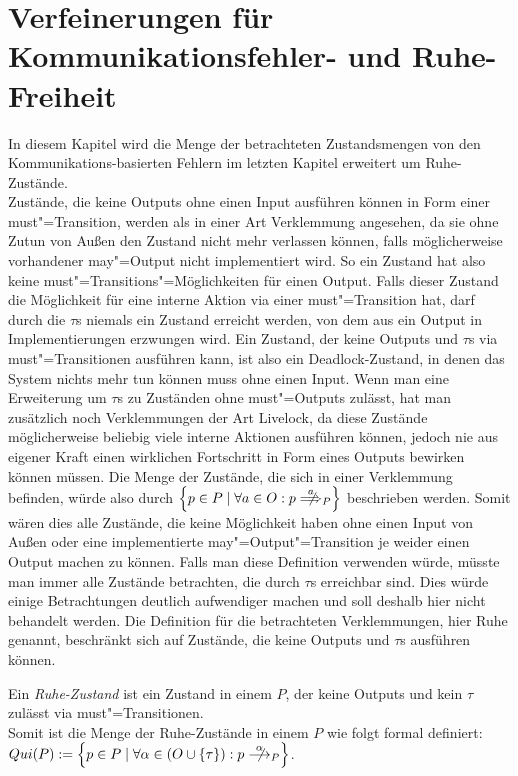 \chapter{Verfeinerungen für Kommunikationsfehler- und Ruhe-Freiheit}

In diesem Kapitel wird die Menge der betrachteten Zustandsmengen von den
Kommunikations-basierten Fehlern im letzten Kapitel erweitert um
Ruhe-Zustände.\\
Zustände, die keine Outputs ohne einen Input ausführen können in Form einer
must"=Transition, werden als in einer Art Verklemmung angesehen, da sie ohne
Zutun von Außen den Zustand nicht mehr verlassen können, falls möglicherweise
vorhandener may"=Output nicht implementiert wird. So ein Zustand hat also keine
must"=Transitions"=Möglichkeiten für einen Output. Falls dieser Zustand die
Möglichkeit für eine interne Aktion via einer must"=Transition hat, darf durch
die $\tau$s niemals ein Zustand erreicht werden, von dem aus ein Output in
Implementierungen erzwungen wird. Ein Zustand, der keine Outputs und $\tau$s
via must"=Transitionen ausführen kann, ist also ein Deadlock-Zustand, in denen
das System nichts mehr tun können muss ohne einen Input. Wenn man eine
Erweiterung um $\tau$s zu Zuständen ohne must"=Outputs zulässt, hat man
zusätzlich noch Verklemmungen der Art Livelock, da diese Zustände
möglicherweise beliebig viele interne Aktionen ausführen können, jedoch nie aus
eigener Kraft einen wirklichen Fortschritt in Form eines Outputs bewirken
können müssen. Die Menge der Zustände, die sich in einer Verklemmung
befinden, würde also durch $\left\{p\in P\mid \forall a\in O: p\nweakmust[a]_P
\right\}$ beschrieben werden. Somit wären dies alle Zustände, die keine
Möglichkeit haben ohne einen Input von Außen oder eine implementierte
may"=Output"=Transition je weider einen Output machen zu können. Falls man
diese Definition verwenden würde, müsste man immer alle Zustände betrachten,
die durch $\tau$s erreichbar sind. Dies würde einige Betrachtungen deutlich
aufwendiger machen und soll deshalb hier nicht behandelt werden. Die Definition
für die betrachteten Verklemmungen, hier Ruhe genannt, beschränkt sich auf
Zustände, die keine Outputs und $\tau$s ausführen können.

\begin{Def}[Ruhe]
  Ein \emph{Ruhe-Zustand} ist ein Zustand in einem \MEIO{} $P$, der keine
  Outputs und kein $\tau$ zulässt via must"=Transitionen.\\
  Somit ist die Menge der Ruhe-Zustände in einem \MEIO{} $P$ wie folgt formal
  definiert: $Qui(P):=\left\{p\in P\mid \forall\alpha\in (O\cup\{\tau\}):p
  \nmust[\alpha]_P\right\}$.
\end{Def}

